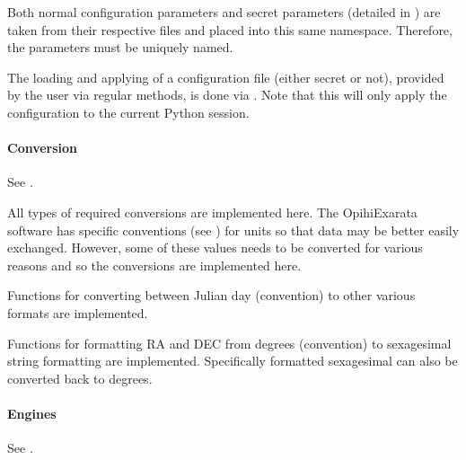 \documentclass[letterpaper,11pt,english]{sphinxmanual}
\begin{document}
\sphinxAtStartPar
Both normal configuration parameters and secret parameters (detailed in
{\hyperref[\detokenize{user/configuration:user-configuration}]{}}) are taken from their respective files and placed
into this same namespace. Therefore, the parameters must be uniquely named.

\sphinxAtStartPar
The loading and applying of a configuration file (either secret or not),
provided by the user via regular methods, is done via
{\hyperref[\detokenize{code/opihiexarata.library.config:opihiexarata.library.config.load_then_apply_configuration}]{}}. Note that
this will only apply the configuration to the current Python session.


\paragraph{Conversion}
\label{\detokenize{technical/architecture/library:conversion}}
\sphinxAtStartPar
See {\hyperref[\detokenize{code/opihiexarata.library.conversion:module-opihiexarata.library.conversion}]{}}.

\sphinxAtStartPar
All types of required conversions are implemented here. The OpihiExarata
software has specific conventions (see {\hyperref[\detokenize{technical/conventions:technical-conventions}]{}}) for units
so that data may be better easily exchanged. However, some of these values
needs to be converted for various reasons and so the conversions are
implemented here.

\sphinxAtStartPar
Functions for converting between Julian day (convention) to other various
formats are implemented.

\sphinxAtStartPar
Functions for formatting RA and DEC from degrees (convention) to sexagesimal
string formatting are implemented. Specifically formatted sexagesimal can also
be converted back to degrees.


\paragraph{Engines}
\label{\detokenize{technical/architecture/library:engines}}
\sphinxAtStartPar
See {\hyperref[\detokenize{code/opihiexarata.library.engine:module-opihiexarata.library.engine}]{}}.
\end{document}
